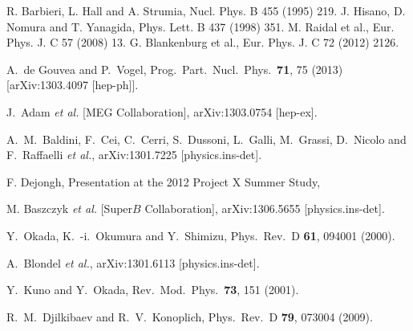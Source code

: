 \begin{thebibliography}{9}

  R. Barbieri, L. Hall and A. Strumia, Nucl. Phys. B 455
(1995) 219.
J. Hisano, D. Nomura and T. Yanagida, Phys. Lett.
B 437 (1998) 351.
M. Raidal et al., Eur. Phys. J. C 57 (2008) 13.
G. Blankenburg et al., Eur. Phys. J. C 72 (2012) 2126.

  A.~de Gouvea and P.~Vogel,
  Prog.\ Part.\ Nucl.\ Phys.\  {\bf 71}, 75 (2013)
  [arXiv:1303.4097 [hep-ph]].

 J.~Adam {\it et al.}  [MEG Collaboration],
  arXiv:1303.0754 [hep-ex].

 A.~M.~Baldini, F.~Cei, C.~Cerri, S.~Dussoni, L.~Galli, M.~Grassi, D.~Nicolo and F.~Raffaelli {\it et al.},
  arXiv:1301.7225 [physics.ins-det].

F. Dejongh, Presentation at the 2012 Project X Summer Study,
\hfill{}

M. Baszczyk {\it et al.} [Super$B$ Collaboration],
arXiv:1306.5655 [physics.ins-det].


   Y.~Okada, K.~-i.~Okumura and Y.~Shimizu, Phys.\ Rev.\ D {\bf 61}, 094001 (2000).

 A.~Blondel {\it et al.}, arXiv:1301.6113 [physics.ins-det].

 Y.~Kuno and Y.~Okada, Rev.\ Mod.\ Phys.\  {\bf 73}, 151 (2001).

 R.~M.~Djilkibaev and R.~V.~Konoplich, Phys.\ Rev.\ D {\bf 79}, 073004 (2009).

\end{thebibliography}
